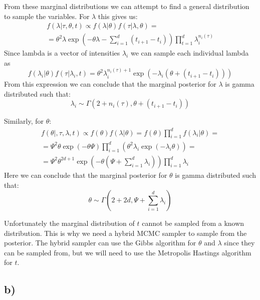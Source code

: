 \documentclass[a4paper]{article}
\begin{document}
From these marginal distributions we can attempt to find a general distribution to sample the variables. For $\lambda$ this gives us:
\begin{equation}
    \begin{gathered}
        f(\lambda | \tau, \theta, t) \propto f(\lambda|\theta)f(\tau|\lambda,\theta) = \\ = \theta^2\lambda\exp(-\theta\lambda-\sum_{i=1}^d(t_{i+1}-t_i))\prod_{t=1}^d\lambda_i^{n_i(\tau)}
    \end{gathered}
\end{equation}
Since lambda is a vector of intensities $\lambda_i$ we can sample each individual lambda as 
\begin{equation}
    f(\lambda_i|\theta)f(\tau|\lambda_i,t) = \theta^2\lambda_i^{n_i(\tau)+1}\exp(-\lambda_i(\theta + (t_{i+1}-t_i)))
\end{equation}
From this expression we can conclude that the marginal posterior for $\lambda$ is gamma distributed such that:
\begin{equation}
    \lambda_i \sim \Gamma(2+n_i(\tau), \theta + (t_{i+1} - t_i))
\end{equation}

Similarly, for $\theta$:
\begin{equation}
    \begin{gathered}
        f(\theta|, \tau, \lambda, t) \propto f(\theta)f(\lambda|\theta) = f(\theta)\prod_{i=1}^d f(\lambda_i|\theta)= \\
        = \Psi^2\theta\exp(-\theta\Psi)\prod_{i=1}^d(\theta^2\lambda_i\exp(-\lambda_i\theta)) = \\
        = \Psi^2\theta^{2d+1}\exp(-\theta(\Psi+\sum_{i=1}^d\lambda_i))\prod_{i=1}^d\lambda_i
    \end{gathered}
\end{equation}
Here we can conclude that the marginal posterior for $\theta$ is gamma distributed such that:
\begin{equation}
    \theta \sim \Gamma(2+2d, \Psi+\sum_{i=1}^d\lambda_i)
\end{equation}

Unfortunately the marginal distribution of $t$ cannot be sampled from a known distribution. This is why we need a hybrid MCMC sampler to sample from the posterior. The hybrid sampler can use the Gibbs algorithm for $\theta$ and $\lambda$ since they can be sampled from, but we will need to use the Metropolis Hastings algorithm for $t$.


\subsection*{b)}
\end{document}
